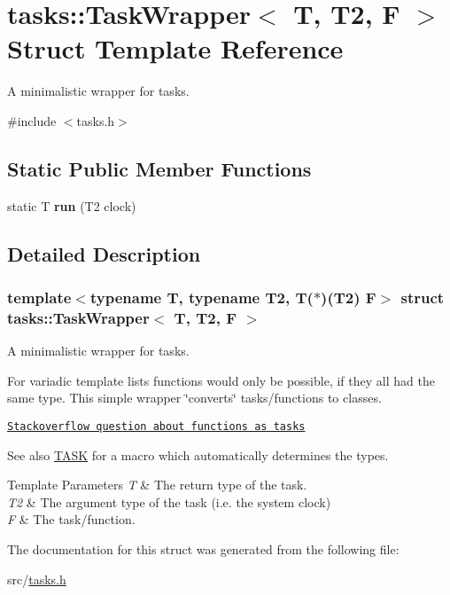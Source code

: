 \hypertarget{structtasks_1_1TaskWrapper}{}\section{tasks\+:\+:Task\+Wrapper$<$ T, T2, F $>$ Struct Template Reference}
\label{structtasks_1_1TaskWrapper}


A minimalistic wrapper for tasks.  




{\ttfamily \#include $<$tasks.\+h$>$}

\subsection*{Static Public Member Functions}
\begin{DoxyCompactItemize}
\item 
\hypertarget{structtasks_1_1TaskWrapper_a5c8d691a2819950cfbe7ec400c85f845}{}\label{structtasks_1_1TaskWrapper_a5c8d691a2819950cfbe7ec400c85f845} 
static T {\bfseries run} (T2 clock)
\end{DoxyCompactItemize}


\subsection{Detailed Description}
\subsubsection*{template$<$typename T, typename T2, T($\ast$)(\+T2) F$>$\newline
struct tasks\+::\+Task\+Wrapper$<$ T, T2, F $>$}

A minimalistic wrapper for tasks. 

For variadic template lists functions would only be possible, if they all had the same type. This simple wrapper \char`\"{}converts\char`\"{} tasks/functions to classes.

\href{http://stackoverflow.com/questions/40387760/functions-as-template-arguments}{\tt Stackoverflow question about functions as tasks}

\begin{DoxySeeAlso}{See also}
\hyperlink{tasks_8h_aeb6b674ade86e11dfb2277cc77930804}{T\+A\+SK} for a macro which automatically determines the types.
\end{DoxySeeAlso}

\begin{DoxyTemplParams}{Template Parameters}
{\em T} & The return type of the task. \\
\hline
{\em T2} & The argument type of the task (i.\+e. the system clock) \\
\hline
{\em F} & The task/function. \\
\hline
\end{DoxyTemplParams}


The documentation for this struct was generated from the following file\+:\begin{DoxyCompactItemize}
\item 
src/\hyperlink{tasks_8h}{tasks.\+h}\end{DoxyCompactItemize}
